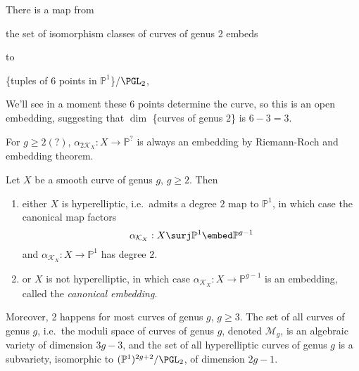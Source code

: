 \documentclass[a4paper]{article}
\renewcommand*{\P}{\mathbb{P}}
\begin{document}
\begin{corollary}
  There is a map from
  
  the set of isomorphism classes of curves of genus 2 embeds

  to

  \{tuples of 6 points in \(\P^1\)\}/\(\PGL_2\),
\end{corollary}
We'll see in a moment these 6 points determine the curve, so this is an open embedding, suggesting that \(\dim\) \{curves of genus \(2\)\} is \(6 - 3 = 3\).

\begin{remark}
  For \(g \geq 2 (?)\), \(\alpha_{2\mathcal K_X}: X \to \P^?\) is always an embedding by Riemann-Roch and embedding theorem.
\end{remark}

\begin{proposition}
  Let \(X\) be a smooth curve of genus \(g\), \(g \geq 2\). Then
  \begin{enumerate}
  \item either \(X\) is hyperelliptic, i.e.\ admits a degree \(2\) map to \(\P^1\), in which case the canonical map factors
    \[
      \alpha_{\mathcal K_X}: X \surj \P^1 \embed \P^{g - 1}
    \]
    and \(\alpha_{\mathcal K_X}: X \to \P^1\) has degree \(2\).
  \item or \(X\) is not hyperelliptic, in which case \(\alpha_{\mathcal K_X}: X \to \P^{g - 1}\) is an embedding, called the \emph{canonical embedding}.
  \end{enumerate}
  Moreover, 2 happens for most curves of genus \(g\), \(g \geq 3\). The set of all curves of genus \(g\), i.e.\ the moduli space of curves of genus \(g\), denoted \(\mathcal M_g\), is an algebraic variety of dimension \(3g - 3\), and the set of all hyperelliptic curves of genus \(g\) is a subvariety, isomorphic to \((\P^1)^{2g + 2}/\PGL_2\), of dimension \(2g - 1\).
\end{proposition}
\end{document}
